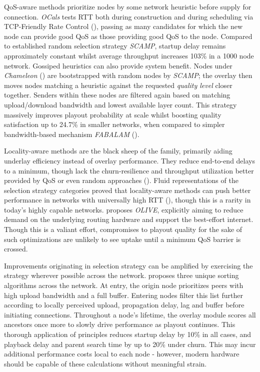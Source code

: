 \documentclass[12pt,a4paper]{article}
\begin{document}
QoS-aware methods prioritize nodes by some network heuristic before supply for connection. \textit{OCals} tests RTT both during construction and during scheduling via TCP-Friendly Rate Control (\cite{Floyd2000}), passing as many candidates for which the new node can provide good QoS as those providing good QoS to the node. Compared to established random selection strategy \textit{SCAMP}, startup delay remains approximately constant whilst average throughput increases 103\% in a 1000 node network. Gossiped heuristics can also provide system benefit. Nodes under \textit{Chameleon} (\cite{Nguyen2010}) are bootstrapped with random nodes by \textit{SCAMP}; the overlay then moves nodes matching a heuristic against the requested \textit{quality level} closer together. Senders within these nodes are filtered again based on matching upload/download bandwidth and lowest available layer count. This strategy massively improves playout probability at scale whilst boosting quality satisfaction up to 24.7\% in smaller networks, when compared to simpler bandwidth-based mechanism \textit{FABALAM} (\cite{Liu2004}).

Locality-aware methods are the black sheep of the family, primarily aiding underlay efficiency instead of overlay performance. They reduce end-to-end delays to a minimum, though lack the churn-resilience and throughput utilization better provided by QoS or even random approaches (\cite{Zhao2012}). Fluid representations of the selection strategy categories proved that locality-aware methods can push better performance in networks with universally high RTT (\cite{CoutodaSilva2011}), though this is a rarity in today's highly capable networks. \cite{Magharei2014} proposes \textit{OLIVE}, explicitly aiming to reduce demand on the underlying routing hardware and support the best-effort internet. Though this is a valiant effort, compromises to playout quality for the sake of such optimizations are unlikely to see uptake until a minimum QoS barrier is crossed.

Improvements originating in selection strategy can be amplified by exercising the strategy  wherever possible across the network. \cite{Budhkar2017} proposes three unique sorting algorithms across the network. At entry, the origin node prioritizes peers with high upload bandwidth and a full buffer. Entering nodes filter this list further according to locally perceived upload, propagation delay, lag and buffer before initiating connections. Throughout a node's lifetime, the overlay module scores all ancestors once more to slowly drive performance as playout continues. This thorough application of principles reduces startup delay by 10\% in all cases, and playback delay and parent search time by up to 20\% under churn. This may incur additional performance costs local to each node - however, modern hardware should be capable of these calculations without meaningful strain.
\end{document}
